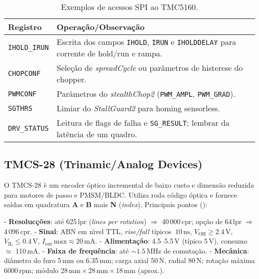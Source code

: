 \noindent\label{sec:tmc5160-examples}
\begin{table}[H]
  \centering
  \caption{Exemplos de acessos SPI ao TMC5160.}
  \label{tab:tmc5160-examples}
  \setlength{\tabcolsep}{4pt}\footnotesize
  \begin{tabularx}{\textwidth}{lX}
    \toprule
    Registro & Opera\c{c}\~ao/Observa\c{c}\~ao \\
    \midrule
    \texttt{IHOLD\_IRUN} & Escrita dos campos \texttt{IHOLD}, \texttt{IRUN} e \texttt{IHOLDDELAY} para corrente de hold/run e rampa. \\
    \texttt{CHOPCONF} & Sele\c{c}\~ao de \emph{spreadCycle} ou par\^ametros de histerese do chopper. \\
    \texttt{PWMCONF} & Par\^ametros do \emph{stealthChop2} (\texttt{PWM\_AMPL}, \texttt{PWM\_GRAD}). \\
    \texttt{SGTHRS} & Limiar do \emph{StallGuard2} para homing sensorless. \\
    \texttt{DRV\_STATUS} & Leitura de flags de falha e \texttt{SG\_RESULT}; lembrar da lat\^encia de um quadro. \\
    \bottomrule
  \end{tabularx}
\end{table}

\FloatBarrier
\subsection{TMCS-28 (Trinamic/Analog Devices)}

O TMCS-28 \`e um encoder \'{o}ptico incremental de baixo custo e dimens\~ao
reduzida para motores de passo e PMSM/BLDC. Utiliza roda c\'odigo \'{o}ptica
e fornece sa\'idas em quadratura \textbf{A} e \textbf{B} mais \textbf{N}
(\emph{index}). Principais pontos (\cite{tmcs28_datasheet}):

- \textbf{Resoluc\c{c}\~oes}: at\'e 625\,lpr (\emph{lines per rotation}) \(\Rightarrow\)
  40\,000\,cpr; op\c{c}\~ao de 64\,lpr \(\Rightarrow\) 4\,096\,cpr.
- \textbf{Sinal}: ABN em n\'{\i}vel TTL, \emph{rise/fall} t\'ipicos \(~10\,\text{ns}\),
  \(V_\text{OH} \ge 2.4\,\text{V}\), \(V_\text{IL} \le 0.4\,\text{V}\), \(I_\text{out}\,\text{max}\approx 20\,\text{mA}\).
- \textbf{Alimenta\c{c}\~ao}: 4.5--5.5\,V (t\'ipico 5\,V), consumo \(\approx\) 110\,mA.
- \textbf{Faixa de frequ\^encia}: at\'e \(\sim 1.5\,\text{MHz}\) de comuta\c{c}\~ao.
- \textbf{Mec\^anica}: di\^ametro do furo 5\,mm ou 6.35\,mm; carga axial 50\,N,
  radial 80\,N; rota\c{c}\~ao m\'axima 6000\,rpm; m\'odulo 28\,mm\,\(\times\)\,28\,mm\,\(\times\)\,18\,mm (aprox.).

